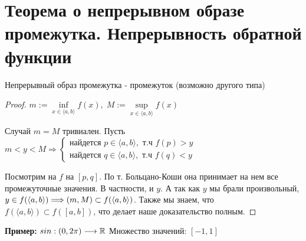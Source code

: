 \section{Теорема о непрерывном образе промежутка. Непрерывность обратной функции}
\begin{theorem-non}
    Непрерывный образ промежутка - промежуток (возможно другого типа)

    \begin{proof} \quad

        $m:= \inf\limits_{x \in \langle a, b \rangle}{f(x)}, \; M:= \sup\limits_{x \in \langle a, b \rangle}{f(x)}$

        Случай $m = M$ тривиален. Пусть $m < y < M \Longrightarrow \begin{cases}
            \text{найдется } p \in \langle a, b \rangle, \text{ т.ч } f(p) > y \\
            \text{найдется } q \in \langle a, b \rangle, \text{ т.ч } f(q) < y
        \end{cases}$

        Посмотрим на $f$ на $[p, q]$. По т. Больцано-Коши она принимает на нем все промежуточные значения.
        В частности, и $y$.
        А так как $y$ мы брали произвольный, $y \in f(\langle a, b \rangle) \Longrightarrow \\
        (m, M) \subset f(\langle a, b \rangle)$. Также мы знаем, что $f(\langle a, b \rangle) \subset f([a, b])$, что делает наше доказательство полным.
    \end{proof}
    \textbf{Пример:} $sin: (0, 2\pi) \longrightarrow \mathbb{R}$ \qquad Множество значений: $[-1, 1]$ 
\end{theorem-non}
